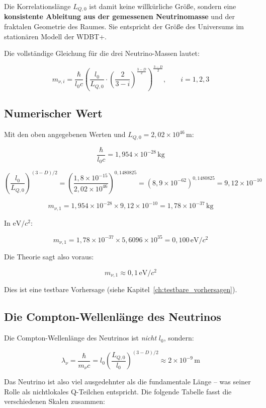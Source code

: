Die Korrelationslänge \( L_{Q,0} \) ist damit keine willkürliche Größe, sondern eine \textbf{konsistente Ableitung aus der gemessenen Neutrinomasse} und der fraktalen Geometrie des Raumes. Sie entspricht der Größe des Universums im stationären Modell der WDBT+.

Die vollständige Gleichung für die drei Neutrino-Massen lautet:

\[
\boxed{m_{\nu,i} = \frac{\hbar}{l_0 c} \left( \frac{l_0}{L_{Q,0}} \cdot \left(\frac{2}{3-i}\right)^{\frac{3-D}{2}} \right)^{\frac{3-D}{2}}}, \qquad i = 1,2,3
\]

\subsection{Numerischer Wert}

Mit den oben angegebenen Werten und \( L_{Q,0} = 2{,}02 \times 10^{46}\,\text{m} \):

\[
\frac{\hbar}{l_0 c} = 1{,}954 \times 10^{-28} \, \text{kg}
\]

\[
\left( \frac{l_0}{L_{Q,0}} \right)^{(3-D)/2} = \left( \frac{1{,}8 \times 10^{-15}}{2{,}02 \times 10^{46}} \right)^{0{,}1480825} = (8{,}9 \times 10^{-62})^{0{,}1480825} = 9{,}12 \times 10^{-10}
\]

\[
m_{\nu,1} = 1{,}954 \times 10^{-28} \times 9{,}12 \times 10^{-10} = 1{,}78 \times 10^{-37} \, \text{kg}
\]

In \( \text{eV}/c^2 \):

\[
m_{\nu,1} = 1{,}78 \times 10^{-37} \times 5{,}6096 \times 10^{35} = 0{,}100 \, \text{eV}/c^2
\]

Die Theorie sagt also voraus:

\[
\boxed{m_{\nu,1} \approx 0{,}1 \, \text{eV}/c^2}
\]

Dies ist eine testbare Vorhersage (siehe Kapitel~\ref{ch:testbare_vorhersagen}).

\subsection{Die Compton-Wellenlänge des Neutrinos}

Die Compton-Wellenlänge des Neutrinos ist \emph{nicht} \( l_0 \), sondern:

\[
\lambda_\nu = \frac{\hbar}{m_\nu c} = l_0 \left( \frac{L_{Q,0}}{l_0} \right)^{(3-D)/2} \approx 2 \times 10^{-9} \, \text{m}
\]

Das Neutrino ist also viel ausgedehnter als die fundamentale Länge – was seiner Rolle als nichtlokales Q-Teilchen entspricht. Die folgende Tabelle fasst die verschiedenen Skalen zusammen:

